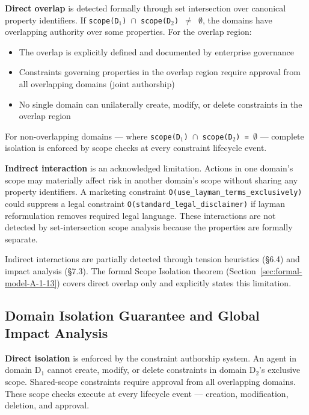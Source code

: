 \textbf{Direct overlap} is detected formally through set intersection over canonical property identifiers. If \texttt{scope(D$_1$) $\cap$ scope(D$_2$) $\neq$ $\emptyset$}, the domains have overlapping authority over some properties. For the overlap region:

\begin{itemize}
  \item The overlap is explicitly defined and documented by enterprise governance
  \item Constraints governing properties in the overlap region require approval from all overlapping domains (joint authorship)
  \item No single domain can unilaterally create, modify, or delete constraints in the overlap region
\end{itemize}


For non-overlapping domains --- where \texttt{scope(D$_1$) $\cap$ scope(D$_2$) = $\emptyset$} --- complete isolation is enforced by scope checks at every constraint lifecycle event.

\textbf{Indirect interaction} is an acknowledged limitation. Actions in one domain's scope may materially affect risk in another domain's scope without sharing any property identifiers. A marketing constraint \texttt{O(use\_\allowbreak{}layman\_\allowbreak{}terms\_\allowbreak{}exclusively)} could suppress a legal constraint \texttt{O(standard\_\allowbreak{}legal\_\allowbreak{}disclaimer)} if layman reformulation removes required legal language. These interactions are not detected by set-intersection scope analysis because the properties are formally separate.

Indirect interactions are partially detected through tension heuristics (\S{}6.4) and impact analysis (\S{}7.3). The formal Scope Isolation theorem (Section~\ref{sec:formal-model-A-1-13}) covers direct overlap only and explicitly states this limitation.

\subsection{Domain Isolation Guarantee and Global Impact Analysis}


\textbf{Direct isolation} is enforced by the constraint authorship system. An agent in domain D$_1$ cannot create, modify, or delete constraints in domain D$_2$'s exclusive scope. Shared-scope constraints require approval from all overlapping domains. These scope checks execute at every lifecycle event --- creation, modification, deletion, and approval.

